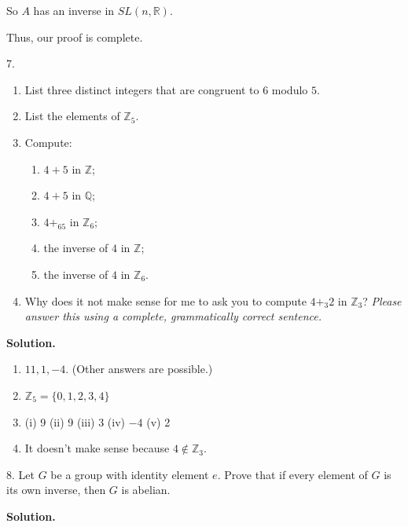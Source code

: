 \documentclass[10pt,]{book}
\theoremstyle{plain}
\theoremstyle{definition}
\theoremstyle{definition}
\theoremstyle{definition}
\theoremstyle{definition}
\numberwithin{equation}{section}
\def\Z{\mathbb{Z}}
\def\R{\mathbb{R}}
\def\Q{\mathbb{Q}}
\begin{document}
\begin{exerciselist}
\begin{equation*}
\end{equation*}

            So \(A\) has an inverse in \(SL(n,\R)\).
\par

      Thus, our proof is complete.
\item[7.]\hypertarget{exercise-18}{}\leavevmode%
\begin{enumerate}[label=(\alph*)]
\item\hypertarget{li-119}{}
          List three distinct integers that are congruent to \(6\) modulo \(5\).
\item\hypertarget{li-120}{}
          List the elements of \(\Z_5\).
\item\hypertarget{li-121}{}
          Compute:
\begin{enumerate}[label=\roman*.]
\item\hypertarget{li-122}{}
                \(4+5\) in \(\Z\);
\item\hypertarget{li-123}{}
                \(4+5\) in \(\Q\);
\item\hypertarget{li-124}{}
                \(4+_65\) in \(\Z_6\);
\item\hypertarget{li-125}{}
                the inverse of \(4\) in \(\Z\);
\item\hypertarget{li-126}{}
                the inverse of \(4\) in \(\Z_6\).
\end{enumerate}

\item\hypertarget{li-127}{}
          Why does it not make sense for me to ask you to compute \(4+_3 2\) in \(\Z_3\)? \emph{Please answer this using a complete, grammatically correct sentence.}
\end{enumerate}
\par\smallskip
\par\smallskip
\noindent\textbf{Solution.}\hypertarget{solution-18}{}\quad
\leavevmode%
\begin{enumerate}[label=(\alph*)]
\item\hypertarget{li-128}{}
          \(11, 1, -4\). (Other answers are possible.)
\item\hypertarget{li-129}{}
          \(\Z_5=\{0,1,2,3,4\}\)
\item\hypertarget{li-130}{}
          (i) 9   (ii) 9   (iii) 3   (iv) \(-4\)   (v) 2
\item\hypertarget{li-131}{}
          It doesn't make sense because \(4\not\in \Z_3\).
\end{enumerate}
\item[8.]\hypertarget{exercise-19}{}
        Let \(G\) be a group with identity element \(e\). Prove that if every element of \(G\) is its own inverse, then \(G\) is abelian.
\par\smallskip
\par\smallskip
\noindent\textbf{Solution.}\hypertarget{solution-19}{}\quad


\end{exerciselist}
\end{document}
